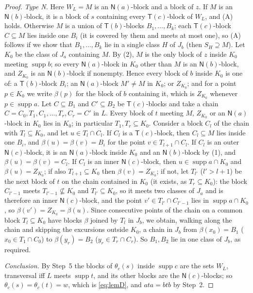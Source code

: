 \documentclass[11pt]{amsart}
\theoremstyle{definition}
\newcommand{\supp}{\operatorname{supp}}
\newcommand{\T}{\mathsf{T}}
\newcommand{\N}{\mathsf{N}}
\begin{document}
\begin{proof}
\emph{Type N.} Here $W_L=M$ is an $\N(a)$-block and a block of $z$. If $M$ is an $\N(b)$-block, it is a block of $s$ containing every $\T(c)$-block of $W_L$, and (A) holds. Otherwise $M$ is a union of $\T(b)$-blocks $B_1,\dots,B_k$; each $\T(c)$-block $C\subseteq M$ lies inside one $B_i$ (it is covered by them and meets at most one), so (A) follows if we show that $B_1,\dots,B_k$ lie in a single class $H$ of $J_b$ (then $S_H\supseteq M$). Let $K_0$ be the class of $J_a$ containing $M$. By (2), $M$ is the only block of $z$ inside $K_0$ meeting $\supp b$; so every $\N(a)$-block in $K_0$ other than $M$ is an $\N(b)$-block, and $Z_{K_0}$ is an $\N(b)$-block if nonempty. Hence every block of $b$ inside $K_0$ is one of: a $\T(b)$-block $B_i$; an $\N(a)$-block $M'\ne M$ in $K_0$; or $Z_{K_0}$; and for a point $p\in K_0$ we write $\beta(p)$ for the block of $b$ containing it, which is $Z_{K_0}$ whenever $p\in\supp a$. Let $C\subseteq B_1$ and $C'\subseteq B_2$ be $\T(c)$-blocks and take a chain $C=C_0,T_1,C_1,\dots,T_r,C_r=C'$ in $L$. Every block of $t$ meeting $M$, $Z_{K_0}$ or an $\N(a)$-block in $K_0$ lies in $K_0$; in particular $T_1,T_r\subseteq K_0$. Consider a block $C_l$ of the chain with $T_l\subseteq K_0$, and let $u\in T_l\cap C_l$. If $C_l$ is a $\T(c)$-block, then $C_l\subseteq M$ lies inside one $B_i$, and $\beta(u)=\beta(v)=B_i$ for the point $v\in T_{l+1}\cap C_l$. If $C_l$ is an outer $\N(c)$-block, it is an $\N(a)$-block inside $K_0$ and an $\N(b)$-block by (1), and $\beta(u)=\beta(v)=C_l$. If $C_l$ is an inner $\N(c)$-block, then $u\in\supp a\cap K_0$ and $\beta(u)=Z_{K_0}$; if also $T_{l+1}\subseteq K_0$ then $\beta(v)=Z_{K_0}$; if not, let $T_{l'}$ ($l'>l+1$) be the next block of $t$ on the chain contained in $K_0$ (it exists, as $T_r\subseteq K_0$): the block $C_{l'-1}$ meets $T_{l'-1}\not\subseteq K_0$ and $T_{l'}\subseteq K_0$, so it meets two classes of $J_a$ and is therefore an inner $\N(c)$-block, and the point $v'\in T_{l'}\cap C_{l'-1}$ lies in $\supp a\cap K_0$, so $\beta(v')=Z_{K_0}=\beta(u)$. Since consecutive points of the chain on a common block $T_l\subseteq K_0$ have blocks $\beta$ joined by $T_l$ in $J_b$, we obtain, walking along the chain and skipping the excursions outside $K_0$, a chain in $J_b$ from $\beta(x_0)=B_1$ ($x_0\in T_1\cap C_0$) to $\beta(y_r)=B_2$ ($y_r\in T_r\cap C_r$). So $B_1,B_2$ lie in one class of $J_b$, as required.

\emph{Conclusion.} By Step~5 the blocks of $\theta_c(s)$ inside $\supp c$ are the sets $W_L$, transversal iff $L$ meets $\supp t$, and its other blocks are the $\N(c)$-blocks; so $\theta_c(s)=\theta_c(t)=w$, which is \eqref{eq:lemD}, and $ata=btb$ by Step~2.
\end{proof}
\end{document}
